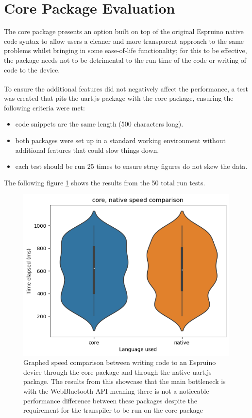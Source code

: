 \documentclass{l4proj}
\begin{document}
\section{Core Package Evaluation}

The core package presents an option built on top of the original Espruino native code syntax to allow users a cleaner and more transparent approach to the same problems whilst bringing in some ease-of-life functionality; for this to be effective, the package needs not to be detrimental to the run time of the code or writing of code to the device.
\\ \\
To ensure the additional features did not negatively affect the performance, a test was created that pits the uart.js package with the core package, ensuring the following criteria were met:

\begin{itemize}
    \item code snippets are the same length (500 characters long).
    \item both packages were set up in a standard working environment without additional features that could slow things down.
    \item each test should be run 25 times to ensure stray figures do not skew the data.
\end{itemize}

The following figure \ref{fig:core_native_speed} shows the results from the 50 total run tests.

\begin{figure}[H]
    \centering
    \includegraphics[width=12cm]{dissertation/images/core-native-speed.png}
    \caption{Graphed speed comparison between writing code to an Espruino device through the core package and through the native uart.js package. The results from this showcase that the main bottleneck is with the WebBluetooth API meaning there is not a noticeable performance difference between these packages despite the requirement for the transpiler to be run on the core package}
    \label{fig:core_native_speed}
\end{figure}
\end{document}
